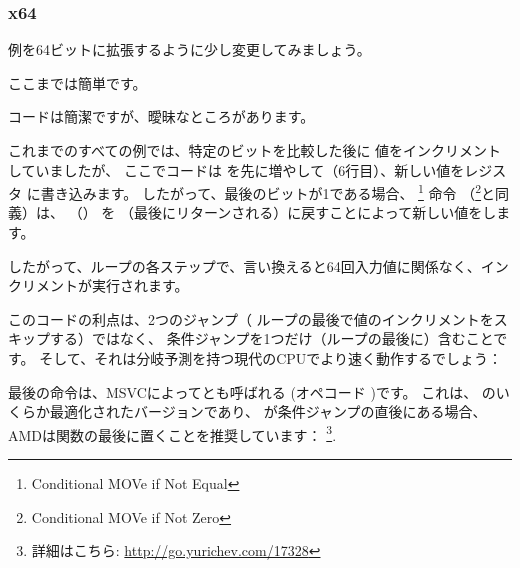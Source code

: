 ﻿\subsubsection{x64}
\label{subsec:popcnt}

例を64ビットに拡張するように少し変更してみましょう。




ここまでは簡単です。






コードは簡潔ですが、曖昧なところがあります。

これまでのすべての例では、特定のビットを比較した後に 値をインクリメントしていましたが、
ここでコードは を先に増やして（6行目）、新しい値をレジスタ \EDX に書き込みます。
したがって、最後のビットが1である場合、 \CMOVNE\footnote{Conditional MOVe if Not Equal} 命令
（\CMOVNZ\footnote{Conditional MOVe if Not Zero}と同義）は、 \EDX （）
を \EAX （最後にリターンされる）に戻すことによって新しい値をします。

したがって、ループの各ステップで、言い換えると64回入力値に関係なく、インクリメントが実行されます。

このコードの利点は、2つのジャンプ（ ループの最後で値のインクリメントをスキップする）ではなく、
条件ジャンプを1つだけ（ループの最後に）含むことです。
そして、それは分岐予測を持つ現代のCPUでより速く動作するでしょう：

\label{FATRET}
最後の命令は、MSVCによってとも呼ばれる
 (オペコード )です。
これは、 \RET のいくらか最適化されたバージョンであり、
\RET が条件ジャンプの直後にある場合、AMDは関数の最後に置くことを推奨しています：
\footnote{詳細はこちら: \url{http://go.yurichev.com/17328}}.




